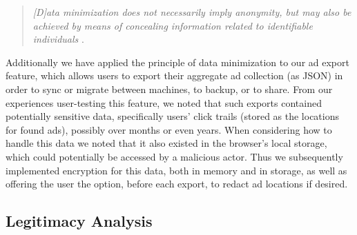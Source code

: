 \documentclass[conference]{IEEEtran}
\begin{document}

\vspace{2mm}
\blockquote{\emph{[D]ata minimization does not necessarily imply anonymity, but may also be achieved by means of concealing information related to identifiable individuals} \cite{Gurses-0}.}
\vspace{1mm}

\noindent Additionally we have applied the principle of data minimization to our ad export feature, which allows users to export their aggregate ad collection (as JSON) in order to sync or migrate between machines, to backup, or to share. From our experiences user-testing this feature, we noted that such exports contained potentially sensitive data, specifically users' click trails (stored as the locations for found ads), possibly over months or even years. When considering how to handle this data we noted that it also existed in the browser's local storage, which could potentially be accessed by a malicious actor. Thus we subsequently implemented encryption for this data, both in memory and in storage, as well as offering the user the option, before each export, to redact ad locations if desired.

\subsection{Legitimacy Analysis}
\end{document}
